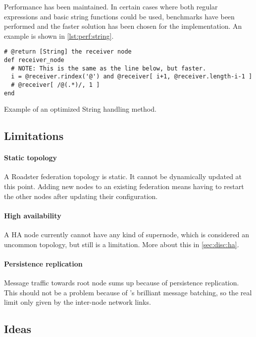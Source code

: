 Performance has been maintained. In certain cases where both regular
expressions and basic string functions could be used, benchmarks have been
performed and the faster solution has been chosen for the implementation. An
example is shown in \autoref{lst:perf:string}.
\begin{listing}[]
  \begin{verbatim}
# @return [String] the receiver node
def receiver_node
  # NOTE: This is the same as the line below, but faster.
  i = @receiver.rindex('@') and @receiver[ i+1, @receiver.length-i-1 ]
  # @receiver[ /@(.*)/, 1 ]
end
  \end{verbatim}
  \caption{Example of an optimized String handling method.}
  \label{lst:perf:string}
\end{listing}




\subsection{Limitations}\label{sec:disc:lim}
\paragraph{Static topology}
A Roadster federation topology is static. It cannot be dynamically updated at
this point. Adding new nodes to an existing federation means having to restart
the other nodes after updating their configuration.

\paragraph{High availability}
A HA node currently cannot have any kind of supernode, which is considered an
uncommon topology, but still is a limitation. More about this in \autoref{sec:disc:ha}.


\paragraph{Persistence replication}
Message traffic towards root node sums up because of persistence
replication. This should not be a problem because of \zmq's brilliant
message batching, so the real limit only given by the inter-node network links.


\subsection{Ideas}
